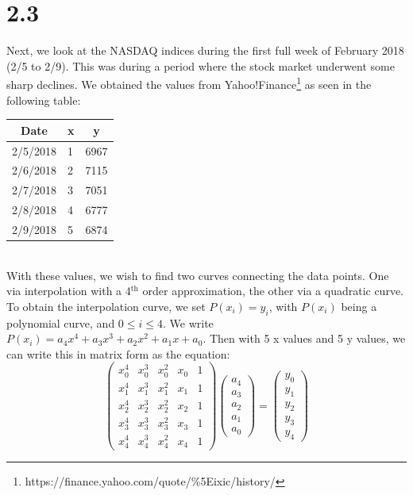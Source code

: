 \documentclass[12pt]{article}
\begin{document}
\section*{2.3}
Next, we look at the NASDAQ indices during the first full week of February 2018 (2/5 to 2/9). This was during a period where the stock market underwent some sharp declines. We obtained the values from Yahoo!Finance\footnote{https://finance.yahoo.com/quote/\%5Eixic/history/} as seen in the following table:
\begin{table}[h]
	\centering
	\begin{tabular}{|l|l|l|}
		\hline
		\multicolumn{1}{|c|}{Date} & x & \multicolumn{1}{c|}{y} \\ \hline
		2/5/2018                   & 1 & 6967                   \\ \hline
		2/6/2018                   & 2 & 7115                   \\ \hline
		2/7/2018                   & 3 & 7051                   \\ \hline
		2/8/2018                   & 4 & 6777                   \\ \hline
		2/9/2018                   & 5 & 6874                   \\ \hline
	\end{tabular}
\end{table}
\\With these values, we wish to find two curves connecting the data points. One via interpolation with a 4$^{\text{th}}$ order approximation, the other via a quadratic curve. To obtain the interpolation curve, we set $P(x_i) = y_i$, with $P(x_i)$ being a polynomial curve, and $0\leq i \leq 4$. We write $P(x_i) = a_4x^4 + a_3x^3 + a_2 x^2 +a_1 x + a_0$. Then with 5 x values and 5 y values, we can write this in matrix form as the equation:
$$\begin{pmatrix}
	x_0^4&x_0^3&x_0^2&x_0&1
	\\x_1^4&x_1^3&x_1^2&x_1&1
	\\x_2^4&x_2^3&x_2^2&x_2&1
	\\x_3^4&x_3^3&x_3^2&x_3&1
	\\x_4^4&x_4^3&x_4^2&x_4&1
\end{pmatrix} 
\begin{pmatrix}
a_4\\a_3\\a_2\\a_1\\a_0
\end{pmatrix}
=
\begin{pmatrix}
y_0\\y_1\\y_2\\y_3\\y_4
\end{pmatrix}$$
\end{document}
